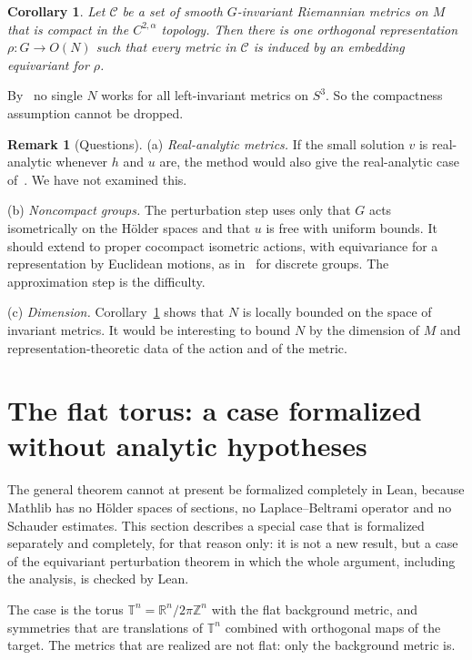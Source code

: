 \documentclass[11pt]{amsart}
\newtheorem{corollary}[theorem]{Corollary}
\theoremstyle{definition}
\newtheorem{remark}[theorem]{Remark}
\newcommand{\R}{\mathbb{R}}
\begin{document}
\begin{corollary}\label{cor:uniform-N}
Let $\mathcal C$ be a set of smooth $G$-invariant Riemannian metrics on $M$ that is compact in the
$C^{2,\alpha}$ topology. Then there is one orthogonal representation $\rho\colon G\to O(N)$ such
that every metric in $\mathcal C$ is induced by an embedding equivariant for $\rho$.
\end{corollary}

By~\cite[\S6]{MS80} no single $N$ works for all left-invariant metrics on $S^3$. So the
compactness assumption cannot be dropped.

\begin{remark}[Questions]\label{rem:questions}
(a) \emph{Real-analytic metrics.} If the small solution $v$ is real-analytic whenever $h$ and $u$
are, the method would also give the real-analytic case of~\cite[\S4]{MS80}. We have not
examined this.

(b) \emph{Noncompact groups.} The perturbation step uses only that $G$ acts isometrically on
the H\"older spaces and that $u$ is free with uniform bounds. It should extend to proper
cocompact isometric actions, with equivariance for a representation by Euclidean motions, as
in~\cite{Qiu25} for discrete groups. The approximation step is the difficulty.

(c) \emph{Dimension.} Corollary~\ref{cor:uniform-N} shows that $N$ is locally bounded on the
space of invariant metrics. It would be interesting to bound $N$ by the dimension of $M$ and
representation-theoretic data of the action and of the metric.
\end{remark}

\section{The flat torus: a case formalized without analytic hypotheses}\label{sec:torus}

The general theorem cannot at present be formalized completely in Lean, because Mathlib has no
H\"older spaces of sections, no Laplace--Beltrami operator and no Schauder estimates. This section
describes a special case that is formalized separately and completely, for that reason only: it
is not a new result, but a case of the equivariant perturbation theorem in which the whole
argument, including the analysis, is checked by Lean.

The case is the torus $\mathbb T^n=\R^n/2\pi\mathbb Z^n$ with the flat background metric, and
symmetries that are translations of $\mathbb T^n$ combined with orthogonal maps of the target.
The metrics that are realized are not flat: only the background metric is.
\end{document}
